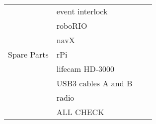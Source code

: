 \documentclass[12pt]{extarticle}
\begin{document}
\begin{tabular}{l|l|l|l}
\multirow{7}{*}{Spare Parts}
& event interlock & \\ \cline{2-3}
& roboRIO & \\ \cline{2-3}
& navX & \\ \cline{2-3}
& rPi & \\ \cline{2-3}
& lifecam HD-3000 & \\ \cline{2-3}
& USB3 cables A and B & \\ \cline{2-3}
& radio & \\ \hline \hline
\hline \hline \hline

& ALL CHECK     &  \\ \cline{2-3}

\end{tabular}
\end{document}

